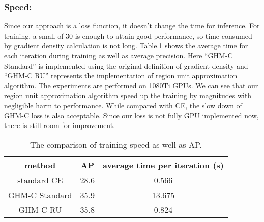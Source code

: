 \documentclass[letterpaper]{article} \usepackage{aaai19}  \usepackage{times}  \usepackage{helvet}  \usepackage{courier}  \usepackage{url}  \usepackage{graphicx}  \usepackage{amsmath,amssymb}
\begin{document}
\subsubsection{Speed:} Since our approach is a loss function, it doesn't change the time for inference. For training, a small  of 30 is enough to attain good performance, so time consumed by gradient density calculation is not long. Table.\ref{tab:speed} shows the average time for each iteration during training as well as average precision. Here ``GHM-C Standard'' is implemented using the original definition of gradient density and ``GHM-C RU'' represents the implementation of region unit approximation algorithm. The experiments are performed on 1080Ti GPUs. We can see that our region unit approximation algorithm speed up the training by magnitudes with negligible harm to performance. While compared with CE, the slow down of  GHM-C loss is also acceptable. Since our loss is not fully GPU implemented now, there is still room for improvement.
\begin{table}[!ht]
\begin{center}
\begin{tabular}{| c | c | c |}
\hline
method & AP & average time per iteration (s) \\
\hline
standard CE & 28.6 & 0.566 \\
GHM-C Standard & 35.9 & 13.675 \\
GHM-C RU & 35.8 & 0.824 \\
\hline 
\end{tabular}
\caption{The comparison of training speed as well as AP.}
\label{tab:speed}
\end{center}
\end{table}
\end{document}
